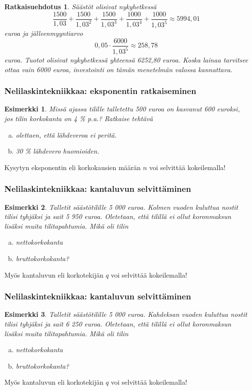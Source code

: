 \documentclass[]{beamer}\usepackage[]{graphicx}\usepackage[]{color}
\newtheorem{esim}{Esimerkki}
\newtheorem{ratkaisu}{Ratkaisuehdotus}
\begin{document}
\begin{frame}
    \begin{ratkaisu}
        Säästöt olisivat nykyhetkessä
        \[
            \frac{1500}{1,03} + \frac{1500}{1,03^2} + \frac{1500}{1,03^3} + \frac{1000}{1,03^4} + \frac{1000}{1,03^5}\approx 5994,01
       \]
       euroa ja jälleenmyyntiarvo
       \[
            0,05\cdot\frac{6000}{1,03^5}\approx 258,78
       \]
       euroa. Tuotot olisivat nykyhetkessä yhteensä 6252,80 euroa. Koska lainaa tarvitsee ottaa vain 6000 euroa,
       investointi on tämän menetelmän valossa kannattava.
    \end{ratkaisu}
\end{frame}

\begin{frame}
    \frametitle{Nelilaskintekniikkaa: eksponentin ratkaiseminen}
    \pause
    \begin{esim}
        Missä ajassa tilille talletettu 500 euroa on kasvanut 600 euroksi, jos tilin korkokanta on 4 \% p.a.?
        Ratkaise tehtävä
        \begin{enumerate}[(a)]
            \item olettaen, että lähdeveroa ei peritä.
            \item 30 \% lähdevero huomioiden.
        \end{enumerate}
    \end{esim}
    \pause
    Kysytyn eksponentin  eli korkokausien määrän $n$ voi selvittää kokeilemalla!
\end{frame}

\begin{frame}
    \frametitle{Nelilaskintekniikkaa: kantaluvun selvittäminen}
    \begin{esim}
        Talletit säästötilille 5 000 euroa. Kolmen vuoden kuluttua nostit tilisi tyhjäksi ja sait 5 950 euroa.
        Oletetaan, että tilillä ei ollut koronmaksun lisäksi muita tilitapahtumia. Mikä oli tilin
        \begin{enumerate}[(a)]
            \item nettokorkokanta
            \item bruttokorkokanta?
        \end{enumerate}
    \end{esim}
    \pause
    Myös kantaluvun eli korkotekijän $q$ voi selvittää kokeilemalla!
\end{frame}

\begin{frame}
    \frametitle{Nelilaskintekniikkaa: kantaluvun selvittäminen}
    \begin{esim}
        Talletit säästötilille 5 000 euroa. Kahdeksan vuoden kuluttua nostit tilisi tyhjäksi ja sait 6 250 euroa.
        Oletetaan, että tilillä ei ollut koronmaksun lisäksi muita tilitapahtumia. Mikä oli tilin
        \begin{enumerate}[(a)]
            \item nettokorkokanta
            \item bruttokorkokanta?
        \end{enumerate}
    \end{esim}
    \pause
    Myös kantaluvun eli korkotekijän $q$ voi selvittää kokeilemalla!
\end{frame}
\end{document}
